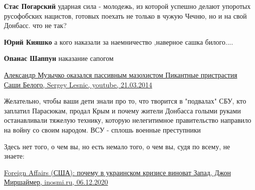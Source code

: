 \begin{itemize}
\begin{itemize}
\textbf{Стас Погарский} ударная сила - молодежь, из которой успешно делают упоротых русофобских нацистов, готовых поехать не только в чужую Чечню, но и на свой Донбасс. что не так?

 
\textbf{Юрий Кияшко} а кого наказали за наемничество ,наверное сашка билого....

 
\textbf{Опанас Шаппун} наказание сапогом

\href{https://www.youtube.com/watch?v=3vhgqeRQROs}{%
Александр Музычко оказался пассивным мазохистом Пикантные пристрастия Саши Белого, %
Sergey Lesnic, youtube, 21.03.2014%
}

\end{itemize}

 

Желательно, чтобы ваши дети знали про то, что творится в "подвалах" СБУ, кто
заплатил Парасюкам, продал Крым и почему жители Донбасса голыми руками
останавливали тяжелую технику, которую нелегитимное правительство направило на
войну со своим народом. ВСУ - сплошь военные преступники

\begin{itemize}
 
Здесь нет того, о чем вы, но есть немало того, о чем вы, судя по всему, не знаете:

\href{https://inosmi.ru/politic/20201206/222742551.html}{%
Foreign Affairs (США): почему в украинском кризисе виноват Запад, Джон Миршаймер, inosmi.ru, 06.12.2020%
}


\end{itemize}
\end{itemize}
